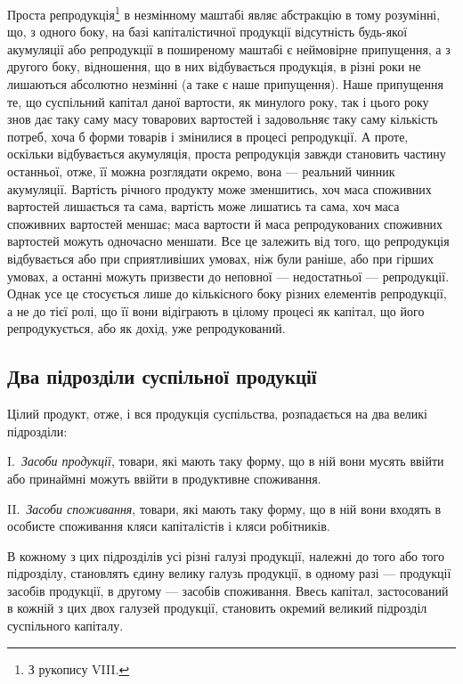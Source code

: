 \label{original-302-2}
Проста репродукція\footnote{
З рукопису VIII.
} в незмінному маштабі являє абстракцію в тому
розумінні, що, з одного боку, на базі капіталістичної продукції відсутність
будь-якої акумуляції або репродукції в поширеному маштабі є
неймовірне припущення, а з другого боку, відношення, що в них відбувається
продукція, в різні роки не лишаються абсолютно незмінні (а таке
є наше припущення). Наше припущення те, що суспільний капітал даної
вартости, як минулого року, так і цього року знов дає таку саму масу товарових вартостей і
задовольняє таку саму кількість потреб, хоча б форми товарів і змінилися в процесі репродукції. А
проте, оскільки відбувається акумуляція, проста репродукція завжди становить частину останньої,
отже, її можна розглядати окремо, вона — реальний чинник акумуляції. Вартість річного продукту може
зменшитись, хоч маса споживних вартостей лишається та сама, вартість може лишатись та сама, хоч маса
споживних вартостей меншає; маса вартости й маса репродукованих
споживних вартостей можуть одночасно меншати. Все це залежить
від того, що репродукція відбувається або при сприятливіших умовах,
ніж були раніше, або при гірших умовах, а останні можуть призвести до
неповної — недостатньої — репродукції. Однак усе це стосується лише до
кількісного боку різних елементів репродукції, а не до тієї ролі, що її
вони відіграють в цілому процесі як капітал, що його репродукується,
або як дохід, уже репродукований.

\subsection[Два підрозділи суспільної продукції]{Два підрозділи суспільної продукції\footnotemark{}}

\label{original-303}
Цілий
продукт, отже, і вся продукція суспільства, розпадається на
два великі підрозділи:

I.~\emph{Засоби продукції}, товари, які мають таку форму, що в ній
вони мусять ввійти або принаймні можуть ввійти в продуктивне споживання.

II.~\emph{Засоби споживання}, товари, які мають таку форму, що в
ній вони входять в особисте споживання кляси капіталістів і кляси робітників.

В кожному з цих підрозділів усі різні галузі продукції, належні до
того або того підрозділу, становлять єдину велику галузь продукції,
в одному разі — продукції засобів продукції, в другому — засобів споживання.
Ввесь капітал, застосований в кожній з цих двох галузей продукції,
становить окремий великий підрозділ суспільного капіталу.

